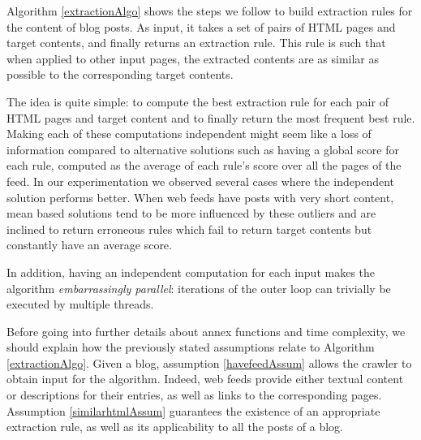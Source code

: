 \extractionAlgo

Algorithm \ref{extractionAlgo} shows the steps we follow to build extraction rules for the content of blog posts. As input, it takes a set of pairs of HTML pages and target contents, and finally returns an extraction rule. This rule is such that when applied to other input pages, the extracted contents are as similar as possible to the corresponding target contents.

The idea is quite simple: to compute the best extraction rule for each pair of HTML pages and target content and to finally return the most frequent best rule. Making each of these computations independent might seem like a loss of information compared to alternative solutions such as having a global score for each rule, computed as the average of each rule's score over all the pages of the feed. In our experimentation we observed several cases where the independent solution performs better. When web feeds have posts with very short content, mean based solutions tend to be more influenced by these outliers and are inclined to return erroneous rules which fail to return target contents but constantly have an average score.

In addition, having an independent computation for each input makes the algorithm \emph{embarrassingly parallel}: iterations of the outer loop can trivially be executed by multiple threads.

Before going into further details about annex functions and time complexity, we should explain how the previously stated assumptions relate to Algorithm \ref{extractionAlgo}. Given a blog, assumption \ref{havefeedAssum} allows the crawler to obtain input for the algorithm. Indeed, web feeds provide either textual content or descriptions for their entries, as well as links to the corresponding pages. Assumption \ref{similarhtmlAssum} guarantees the existence of an appropriate extraction rule, as well as its applicability to all the posts of a blog.


